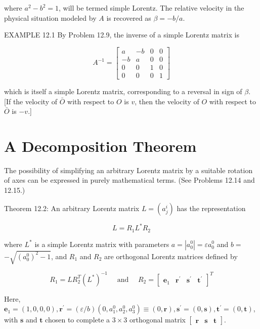 \documentclass[10pt]{article}
\begin{document}
where $a^{2}-b^{2}=1$, will be termed simple Lorentz. The relative velocity in the physical situation modeled by $A$ is recovered as $\beta=-b / a$.

EXAMPLE 12.1 By Problem 12.9, the inverse of a simple Lorentz matrix is

$$
A^{-1}=\left[\begin{array}{cccc}
a & -b & 0 & 0 \\
-b & a & 0 & 0 \\
0 & 0 & 1 & 0 \\
0 & 0 & 0 & 1
\end{array}\right]
$$

which is itself a simple Lorentz matrix, corresponding to a reversal in sign of $\beta$. [If the velocity of $\bar{O}$ with respect to $O$ is $v$, then the velocity of $O$ with respect to $\bar{O}$ is $-v$.]

\section*{A Decomposition Theorem}
The possibility of simplifying an arbitrary Lorentz matrix by a suitable rotation of axes can be expressed in purely mathematical terms. (See Problems 12.14 and 12.15.)

Theorem 12.2: An arbitrary Lorentz matrix $L=\left(a_{j}^{i}\right)$ has the representation

$$
L=R_{1} L^{*} R_{2}
$$

where $L^{*}$ is a simple Lorentz matrix with parameters $a=\left|a_{0}^{0}\right|=\varepsilon a_{0}^{0}$ and $b=$ $-\sqrt{\left(a_{0}^{0}\right)^{2}-1}$, and $R_{1}$ and $R_{2}$ are orthogonal Lorentz matrices defined by

\[
R_{1}=L R_{2}^{T}\left(L^{*}\right)^{-1} \quad \text { and } \quad R_{2}=\left[\begin{array}{llll}
\mathbf{e}_{1} & \mathbf{r}^{\prime} & \mathbf{s}^{\prime} & \mathbf{t}^{\prime} \tag{12.14}
\end{array}\right]^{T}
\]

Here, $\mathbf{e}_{1}=(1,0,0,0), \mathbf{r}^{\prime}=(\varepsilon / b)\left(0, a_{1}^{0}, a_{2}^{0}, a_{3}^{0}\right) \equiv(0, \mathbf{r}), \mathbf{s}^{\prime}=(0, \mathbf{s}), \mathbf{t}^{\prime}=(0, \mathbf{t})$, with $\mathbf{s}$ and $\mathbf{t}$ chosen to complete a $3 \times 3$ orthogonal matrix $\left[\begin{array}{lll}\mathbf{r} & \mathbf{s} & \mathbf{t}\end{array}\right]$.
\end{document}
